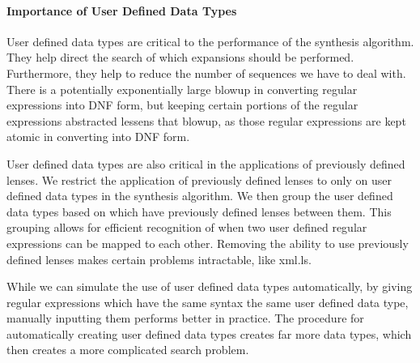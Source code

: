 \documentclass[numbers,10pt,preprint\ifanon ,nocopyrightspace\fi]{sigplanconf}
\begin{document}



\paragraph*{Importance of User Defined Data Types}

User defined data types are critical to the performance of
the synthesis algorithm.  They help direct the search of
which expansions should be performed.  Furthermore, they help to reduce the
number of sequences we have to deal with.  There is a potentially exponentially
large blowup in converting regular expressions into DNF form, but keeping
certain portions of the regular expressions abstracted lessens that blowup,
as those regular expressions are kept atomic in converting into DNF form.

User defined data types are also critical in the applications of previously
defined lenses.  We restrict the application of previously defined lenses to
only on user defined data types in the synthesis algorithm.  We then group the
user defined data types based on which have previously defined lenses between
them.  This grouping allows for efficient recognition of when two user defined regular
expressions can be mapped to each other.  Removing the ability to use previously
defined lenses makes certain problems intractable, like xml.ls.

While we can simulate the use of user defined data types automatically, by
giving regular expressions which have the same syntax the same user defined data
type, manually inputting them performs better in practice.  The
procedure for automatically creating user defined data types creates far more
data types, which then creates a more complicated search problem.



\end{document}
